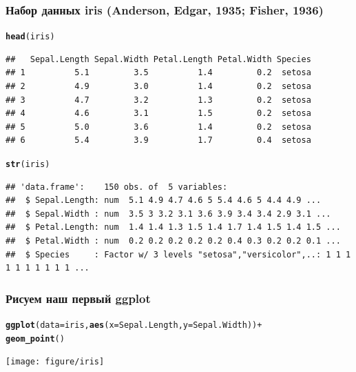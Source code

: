 \documentclass[compress]{beamer}\usepackage[]{graphicx}\usepackage[]{color}
\makeatletter
\newcommand{\hlopt}[1]{\textcolor[rgb]{0,0,0}{#1}}%
\newcommand{\hlstd}[1]{\textcolor[rgb]{0.345,0.345,0.345}{#1}}%
\newcommand{\hlkwc}[1]{\textcolor[rgb]{0.333,0.667,0.333}{#1}}%
\newcommand{\hlkwd}[1]{\textcolor[rgb]{0.737,0.353,0.396}{\textbf{#1}}}%
\newenvironment{kframe}{%
 \def\at@end@of@kframe{}%
 \ifinner\ifhmode%
  \def\at@end@of@kframe{\end{minipage}}%
  \begin{minipage}{\columnwidth}%
 \fi\fi%
 \def\FrameCommand##1{\hskip\@totalleftmargin \hskip-\fboxsep
 \colorbox{shadecolor}{##1}\hskip-\fboxsep
     \hskip-\linewidth \hskip-\@totalleftmargin \hskip\columnwidth}%
 \MakeFramed {\advance\hsize-\width
   \@totalleftmargin\z@ \linewidth\hsize
   \@setminipage}}%
 {\par\unskip\endMakeFramed%
 \at@end@of@kframe}
\newenvironment{knitrout}{}{} %
\makeatother
\begin{document}
\begin{frame}[fragile]
\frametitle{Набор данных iris (Anderson, Edgar, 1935; Fisher, 1936)}
\begin{knitrout}\footnotesize
{}\color{fgcolor}\begin{kframe}
\begin{alltt}
\hlkwd{head}\hlstd{(iris)}
\end{alltt}
\begin{verbatim}
##   Sepal.Length Sepal.Width Petal.Length Petal.Width Species
## 1          5.1         3.5          1.4         0.2  setosa
## 2          4.9         3.0          1.4         0.2  setosa
## 3          4.7         3.2          1.3         0.2  setosa
## 4          4.6         3.1          1.5         0.2  setosa
## 5          5.0         3.6          1.4         0.2  setosa
## 6          5.4         3.9          1.7         0.4  setosa
\end{verbatim}
\begin{alltt}
\hlkwd{str}\hlstd{(iris)}
\end{alltt}
\begin{verbatim}
## 'data.frame':	150 obs. of  5 variables:
##  $ Sepal.Length: num  5.1 4.9 4.7 4.6 5 5.4 4.6 5 4.4 4.9 ...
##  $ Sepal.Width : num  3.5 3 3.2 3.1 3.6 3.9 3.4 3.4 2.9 3.1 ...
##  $ Petal.Length: num  1.4 1.4 1.3 1.5 1.4 1.7 1.4 1.5 1.4 1.5 ...
##  $ Petal.Width : num  0.2 0.2 0.2 0.2 0.2 0.4 0.3 0.2 0.2 0.1 ...
##  $ Species     : Factor w/ 3 levels "setosa","versicolor",..: 1 1 1 1 1 1 1 1 1 1 ...
\end{verbatim}
\end{kframe}
\end{knitrout}

\end{frame}

\begin{frame}[fragile]
\frametitle{Рисуем наш первый ggplot}
\begin{knitrout}\footnotesize
{}\color{fgcolor}\begin{kframe}
\begin{alltt}
\hlkwd{ggplot}\hlstd{(}\hlkwc{data} \hlstd{= iris,} \hlkwd{aes}\hlstd{(}\hlkwc{x} \hlstd{= Sepal.Length,} \hlkwc{y} \hlstd{= Sepal.Width))} \hlopt{+}
  \hlkwd{geom_point}\hlstd{()}
\end{alltt}
\end{kframe}
\texttt{[image: figure/iris]} 

\end{knitrout}

\end{frame}
\end{document}

